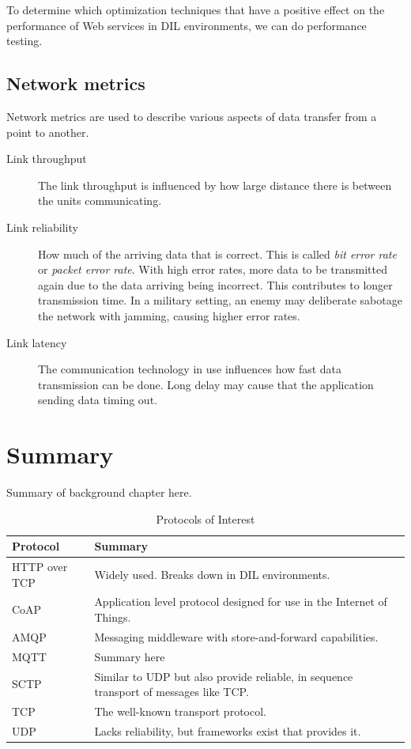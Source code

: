 To determine which optimization techniques that have a positive effect on the
performance of Web services in DIL environments, we can do performance testing.

\subsection{Network metrics}

Network metrics are used to describe various aspects of data transfer from a
point to another.

\begin{description}

\item[Link throughput] The link throughput is influenced by how large distance
there is between the units communicating.

\item[Link reliability] How much of the arriving data that is correct. This is
called \textit{bit error rate} or \textit{packet error rate}. With high error
rates, more data to be transmitted again due to the data arriving being
incorrect. This contributes to longer transmission time. In a military setting,
an enemy may deliberate sabotage the network with jamming, causing higher error
rates.

\item[Link latency] The communication technology in use influences how fast data
transmission can be done. Long delay may cause that the application sending data
timing out.

\end{description}

\section{Summary}
Summary of background chapter here.

\begin{table}[h]
\begin{tabularx}{\textwidth}{| X | X |}
\hline
  \textbf{Protocol} & \textbf{Summary} \\ \hline
  HTTP over TCP & Widely used. Breaks down in DIL environments.\\ \hline
  CoAP & Application level protocol designed for use in the Internet of Things. \\ \hline
  AMQP & Messaging middleware with store-and-forward capabilities.\\ \hline
  MQTT & Summary here\\ \hline
  SCTP & Similar to UDP but also provide reliable, in sequence transport of messages like TCP. \\ \hline
  TCP & The well-known transport protocol. \\ \hline
  UDP & Lacks reliability, but frameworks exist that provides it. \\ \hline
\end{tabularx}
\caption{Protocols of Interest}
\end{table}
